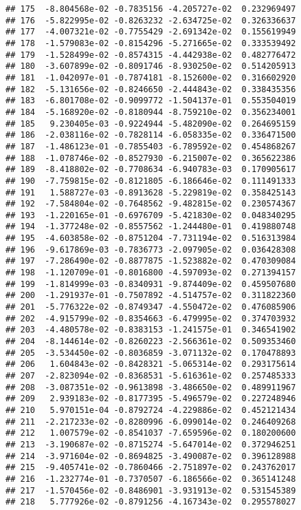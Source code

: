 \documentclass[
]{article}
\begin{document}
\begin{verbatim}
## 175  -8.804568e-02 -0.7835156 -4.205727e-02  0.232969497
## 176  -5.822995e-02 -0.8263232 -2.634725e-02  0.326336637
## 177  -4.007321e-02 -0.7755429 -2.691342e-02  0.155619949
## 178  -1.579083e-02 -0.8154296 -5.271665e-02  0.333539492
## 179  -1.528499e-02 -0.8574315 -4.442938e-02  0.482776472
## 180  -3.607899e-02 -0.8091746 -8.930250e-02  0.514205913
## 181  -1.042097e-01 -0.7874181 -8.152600e-02  0.316602920
## 182  -5.131656e-02 -0.8246650 -2.444843e-02  0.338435356
## 183  -6.801708e-02 -0.9099772 -1.504137e-01  0.553504019
## 184  -5.168920e-02 -0.8180944 -8.759210e-02  0.356234001
## 185   9.230405e-03 -0.9224944 -5.482090e-02  0.264695159
## 186  -2.038116e-02 -0.7828114 -6.058335e-02  0.336471500
## 187  -1.486123e-01 -0.7855403 -6.789592e-02  0.454868267
## 188  -1.078746e-02 -0.8527930 -6.215007e-02  0.365622386
## 189  -8.418802e-02 -0.7708634 -6.940783e-03  0.170905617
## 190  -7.759815e-02 -0.8121805 -6.186646e-02  0.111491333
## 191   1.588727e-03 -0.8913628 -5.229819e-02  0.358425143
## 192  -7.584804e-02 -0.7648562 -9.482815e-02  0.230574367
## 193  -1.220165e-01 -0.6976709 -5.421830e-02  0.048340295
## 194  -1.377248e-02 -0.8557562 -1.244480e-01  0.419880748
## 195  -4.603858e-02 -0.8751204 -7.731194e-02  0.516313984
## 196  -9.617869e-03 -0.7836773 -2.097905e-02  0.036428308
## 197  -7.286490e-02 -0.8877875 -1.523882e-02  0.470309084
## 198  -1.120709e-01 -0.8016800 -4.597093e-02  0.271394157
## 199  -1.814999e-03 -0.8340931 -9.874409e-02  0.459507680
## 200  -1.291937e-01 -0.7507892 -4.514757e-02  0.311822360
## 201  -5.776322e-02 -0.8749347 -4.550472e-02  0.476085906
## 202  -4.915799e-02 -0.8354663 -6.479995e-02  0.374703932
## 203  -4.480578e-02 -0.8383153 -1.241575e-01  0.346541902
## 204  -8.144614e-02 -0.8260223 -2.566361e-02  0.509353460
## 205  -3.534450e-02 -0.8036859 -3.071132e-02  0.170478893
## 206   1.604843e-02 -0.8428321 -5.065314e-02  0.293175614
## 207  -2.823094e-02 -0.8368531 -5.616361e-02  0.257485333
## 208  -3.087351e-02 -0.9613898 -3.486650e-02  0.489911967
## 209   2.939183e-02 -0.8177395 -5.496579e-02  0.227248946
## 210   5.970151e-04 -0.8792724 -4.229886e-02  0.452121434
## 211  -2.217233e-02 -0.8280996 -6.099014e-02  0.246409268
## 212   1.007579e-02 -0.8541037 -7.659596e-02  0.180200600
## 213  -3.190687e-02 -0.8715274 -5.647014e-02  0.372946251
## 214  -3.971604e-02 -0.8694825 -3.490087e-02  0.396128988
## 215  -9.405741e-02 -0.7860466 -2.751897e-02  0.243762017
## 216  -1.232774e-01 -0.7370507 -6.186566e-02  0.365141248
## 217  -1.570456e-02 -0.8486901 -3.931913e-02  0.531545389
## 218   5.777926e-02 -0.8791256 -4.167343e-02  0.295578027

\end{verbatim}
\end{document}
